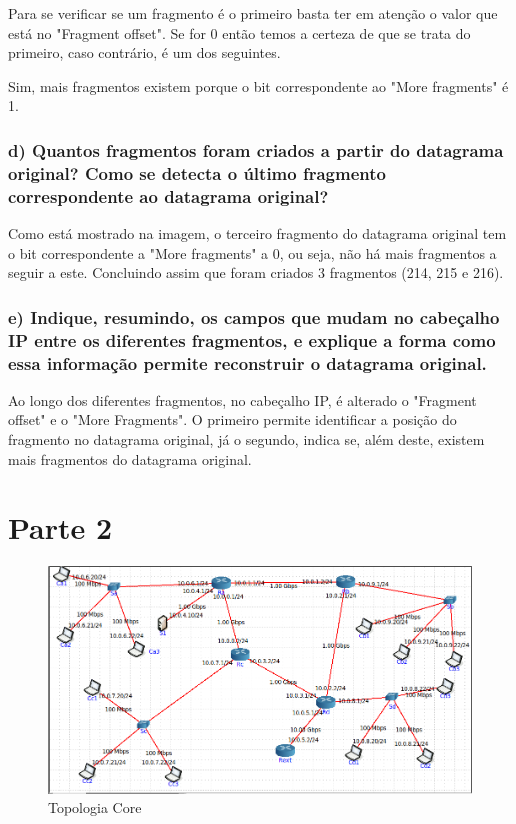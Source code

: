 \documentclass[a4paper]{report}
\begin{document}
Para se verificar se um fragmento é o primeiro basta ter em atenção o valor
que está no "Fragment offset". Se for 0 então temos a certeza de que se trata
do primeiro, caso contrário, é um dos seguintes.

Sim, mais fragmentos existem porque o bit correspondente ao "More fragments" é 1.

\subsection{d) Quantos fragmentos foram criados a partir do datagrama original?
Como se detecta o último fragmento correspondente ao datagrama original?}

Como está mostrado na imagem, o terceiro fragmento do datagrama original
tem o bit correspondente a "More fragments" a 0, ou seja, não há mais 
fragmentos a seguir a este. Concluindo assim que foram criados 3 fragmentos 
(214, 215 e 216).

\subsection{e) Indique, resumindo, os campos que mudam no cabeçalho IP entre 
os diferentes fragmentos, e explique a forma como essa informação permite
reconstruir o datagrama original.}

Ao longo dos diferentes fragmentos, no cabeçalho IP, é alterado o "Fragment offset" e
o "More Fragments". O primeiro permite identificar a posição do fragmento no 
datagrama original, já o segundo, indica se, além deste, existem mais fragmentos do
datagrama original.


\chapter{Parte 2}

\begin{figure}[H]
    \centering 
    \includegraphics[width=\textwidth]{images/topologiaCore.png}
    \caption{Topologia Core}
    \label{fig:topologiaCore}
\end{figure}
\end{document}
